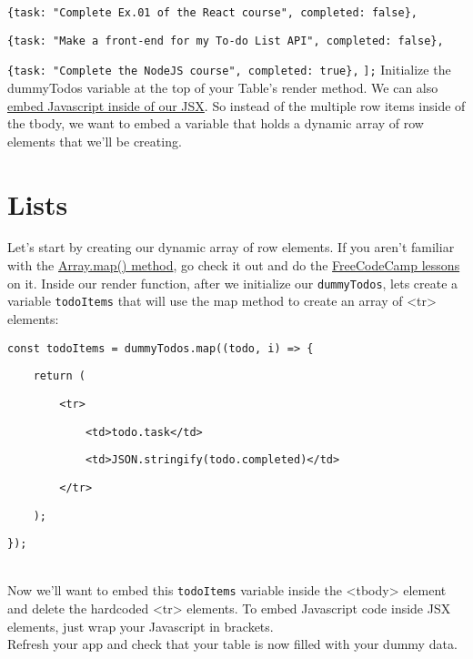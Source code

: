 \documentclass{42-en}
\begin{document}
\texttt{\{task: "Complete Ex.01 of the React course", completed: false\},}

\texttt{\{task: "Make a front-end for my To-do List API", completed: false\},}

\texttt{\{task: "Complete the NodeJS course", completed: true\},}
\newline
\texttt{];}
\newline
Initialize the dummyTodos variable at the top of your Table’s render method. We can also \href{https://reactjs.org/docs/introducing-jsx.html#embedding-expressions-in-jsx}{embed Javascript inside of our JSX}. So instead of the multiple row items inside of the tbody, we want to embed a variable that holds a dynamic array of row elements that we’ll be creating.\\
\section{Lists}
Let’s start by creating our dynamic array of row elements. If you aren’t familiar with the \href{https://developer.mozilla.org/en-US/docs/Web/JavaScript/Reference/Global_Objects/Array/map}{Array.map() method}, go check it out and do the \href{https://learn.freecodecamp.org/javascript-algorithms-and-data-structures/functional-programming/use-the-map-method-to-extract-data-from-an-array}{FreeCodeCamp lessons} on it. Inside our render function, after we initialize our \texttt{dummyTodos}, lets create a variable \texttt{todoItems} that will use the map method to create an array of <tr> elements:

\texttt{const todoItems = dummyTodos.map((todo, i) => \{}

\texttt{~~~~return (}

\texttt{~~~~~~~~<tr>}

\texttt{~~~~~~~~~~~~<td>{todo.task}</td>}

\texttt{~~~~~~~~~~~~<td>{JSON.stringify(todo.completed)}</td>}

\texttt{~~~~~~~~</tr>}

\texttt{~~~~);}

\texttt{\});}

~\\
Now we’ll want to embed this \texttt{todoItems} variable inside the <tbody> element and delete the hardcoded <tr> elements. To embed Javascript code inside JSX elements, just wrap your Javascript in {} brackets.
~\\
Refresh your app and check that your table is now filled with your dummy data.
\end{document}
